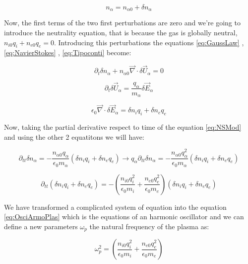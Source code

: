 \documentclass[spanish,notitlepage,letterpaper,11pt]{article} %
\numberwithin{equation}{subsection}
\begin{document}
    \begin{equation}
        n_{\alpha} = n_{\alpha 0} + \delta n_{\alpha}
    \end{equation}

    Now, the first terms of the two first perturbations are zero and we're going to introduce the neutrality equation, that is because the gas is globally neutral, $n_{i0}q_i + n_{e0}q_e = 0$. Introducing this perturbations the equations \ref{eq:GaussLaw} , \ref{eq:NavierStokes} , \ref{eq:Tipoconti} become:

    \begin{equation}\label{eq:NSMod}
        \partial_t\delta n_{\alpha} + n_{\alpha 0}\Vec{\nabla}\cdot \delta \Vec{U}_{\alpha} = 0
    \end{equation}

    \begin{equation}
        \partial_t \delta\Vec{U}_{\alpha} = \frac{q_{\alpha}}{m_{\alpha}}\delta\Vec{E}_{\alpha}
    \end{equation}

    \begin{equation}
        \epsilon_0\Vec{\nabla}\cdot\delta\Vec{E}_{\alpha} = \delta n_iq_i + \delta n_eq_e
    \end{equation}

    Now, taking the partial derivative respect to time of the equation \ref{eq:NSMod} and using the other 2 equatitons we will have:

    \begin{equation*}
        \partial_{tt}\delta n_{\alpha} = -\frac{n_{\alpha 0} q_{\alpha}}{\epsilon_0m_{\alpha}}(\delta n_iq_i + \delta n_eq_e) \rightarrow 
        q_{\alpha}\partial_{tt}\delta n_{\alpha} = -\frac{n_{\alpha 0} q_{\alpha}^2}{\epsilon_0m_{\alpha}}(\delta n_iq_i + \delta n_eq_e)
    \end{equation*}

    \begin{equation}\label{eq:OsciArmoPlas}
        \partial_{tt}(\delta n_iq_i + \delta n_eq_e) = - \left(\frac{n_{i0}q_i^2}{\epsilon_0m_i} + \frac{n_{e0}q_e^2}{\epsilon_0m_e} \right)(\delta n_iq_i + \delta n_eq_e)
    \end{equation}

    We have transformed a complicated system of equation into the equation \ref{eq:OsciArmoPlas} which is the equations of an harmonic oscillator and we can define a new parameters $\omega_p$ the natural frequency of the plasma as:

    \begin{equation}
        \omega_p^2 = \left(\frac{n_{i0}q_i^2}{\epsilon_0m_i} + \frac{n_{e0}q_e^2}{\epsilon_0m_e} \right)
        
    \end{equation}
\end{document}
